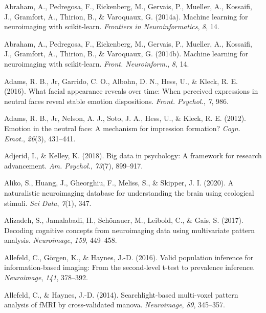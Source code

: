 \documentclass[11pt,american,a4paper,oneside,]{memoir} %
\begin{document}
\leavevmode\hypertarget{ref-abraham2014machine}{}%
Abraham, A., Pedregosa, F., Eickenberg, M., Gervais, P., Mueller, A., Kossaifi, J., Gramfort, A., Thirion, B., \& Varoquaux, G. (2014a). Machine learning for neuroimaging with scikit-learn. \emph{Frontiers in Neuroinformatics}, \emph{8}, 14.

\leavevmode\hypertarget{ref-Abraham2014-ef}{}%
Abraham, A., Pedregosa, F., Eickenberg, M., Gervais, P., Mueller, A., Kossaifi, J., Gramfort, A., Thirion, B., \& Varoquaux, G. (2014b). Machine learning for neuroimaging with scikit-learn. \emph{Front. Neuroinform.}, \emph{8}, 14.

\leavevmode\hypertarget{ref-Adams2016-tz}{}%
Adams, R. B., Jr, Garrido, C. O., Albohn, D. N., Hess, U., \& Kleck, R. E. (2016). What facial appearance reveals over time: When perceived expressions in neutral faces reveal stable emotion dispositions. \emph{Front. Psychol.}, \emph{7}, 986.

\leavevmode\hypertarget{ref-Adams2012-dl}{}%
Adams, R. B., Jr, Nelson, A. J., Soto, J. A., Hess, U., \& Kleck, R. E. (2012). Emotion in the neutral face: A mechanism for impression formation? \emph{Cogn. Emot.}, \emph{26}(3), 431--441.

\leavevmode\hypertarget{ref-Adjerid2018-vs}{}%
Adjerid, I., \& Kelley, K. (2018). Big data in psychology: A framework for research advancement. \emph{Am. Psychol.}, \emph{73}(7), 899--917.

\leavevmode\hypertarget{ref-Aliko2020-ry}{}%
Aliko, S., Huang, J., Gheorghiu, F., Meliss, S., \& Skipper, J. I. (2020). A naturalistic neuroimaging database for understanding the brain using ecological stimuli. \emph{Sci Data}, \emph{7}(1), 347.

\leavevmode\hypertarget{ref-alizadeh2017decoding}{}%
Alizadeh, S., Jamalabadi, H., Schönauer, M., Leibold, C., \& Gais, S. (2017). Decoding cognitive concepts from neuroimaging data using multivariate pattern analysis. \emph{Neuroimage}, \emph{159}, 449--458.

\leavevmode\hypertarget{ref-Allefeld2016-xp}{}%
Allefeld, C., Görgen, K., \& Haynes, J.-D. (2016). Valid population inference for information-based imaging: From the second-level t-test to prevalence inference. \emph{Neuroimage}, \emph{141}, 378--392.

\leavevmode\hypertarget{ref-allefeld2014searchlight}{}%
Allefeld, C., \& Haynes, J.-D. (2014). Searchlight-based multi-voxel pattern analysis of fMRI by cross-validated manova. \emph{Neuroimage}, \emph{89}, 345--357.
\end{document}
